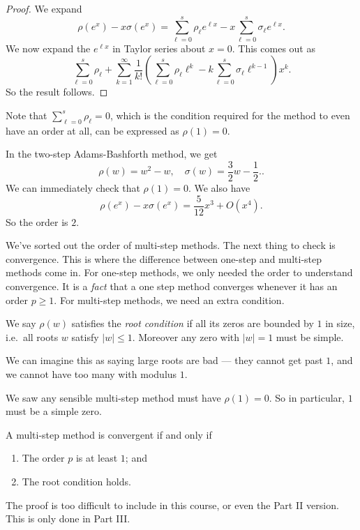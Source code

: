 \documentclass[a4paper]{article}
\begin{document}
\begin{proof}
  We expand
  \[
    \rho(e^x) - x \sigma(e^x) = \sum_{\ell = 0}^s \rho_\ell e^{\ell x} - x \sum_{\ell = 0}^s \sigma_\ell e^{\ell x}.
  \]
  We now expand the $e^{\ell x}$ in Taylor series about $x = 0$. This comes out as
  \[
    \sum_{\ell = 0}^s \rho_\ell + \sum_{k = 1}^\infty \frac{1}{k!} \left(\sum_{\ell = 0}^s \rho_\ell \ell^k - k \sum_{\ell = 0}^s \sigma_\ell \ell^{k - 1}\right) x^k.
  \]
  So the result follows.
\end{proof}
Note that $\sum_{\ell = 0}^s \rho_\ell = 0$, which is the condition required for the method to even have an order at all, can be expressed as $\rho(1) = 0$.

\begin{eg}[AB2]
  In the two-step Adams-Bashforth method, we get
  \[
    \rho(w) = w^2 - w,\quad \sigma(w) = \frac{3}{2} w - \frac{1}{2}..
  \]
  We can immediately check that $\rho(1) = 0$. We also have
  \[
    \rho(e^x) - x \sigma(e^x) = \frac{5}{12} x^3 + O(x^4).
  \]
  So the order is $2$.
\end{eg}

We've sorted out the order of multi-step methods. The next thing to check is convergence. This is where the difference between one-step and multi-step methods come in. For one-step methods, we only needed the order to understand convergence. It is a \emph{fact} that a one step method converges whenever it has an order $p \geq 1$. For multi-step methods, we need an extra condition.

\begin{defi}
  We say $\rho(w)$ satisfies the \emph{root condition} if all its zeros are bounded by $1$ in size, i.e.\ all roots $w$ satisfy $|w| \leq 1$. Moreover any zero with $|w| = 1$ must be simple.
\end{defi}
We can imagine this as saying large roots are bad --- they cannot get past $1$, and we cannot have too many with modulus $1$.

We saw any sensible multi-step method must have $\rho(1) = 0$. So in particular, $1$ must be a simple zero.

\begin{thm}
  A multi-step method is convergent if and only if
  \begin{enumerate}
    \item The order $p$ is at least $1$; and
    \item The root condition holds.
  \end{enumerate}
\end{thm}
The proof is too difficult to include in this course, or even the Part II version. This is only done in Part III.
\end{document}
